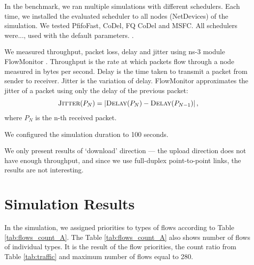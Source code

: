In the benchmark, we ran multiple simulations with different schedulers. Each time, we installed the evaluated scheduler to all nodes (NetDevices) of the simulation. We tested PfifoFast, CoDel, FQ CoDel and MSFC.  All schedulers were..., used with the default parameters. .

We measured throughput, packet loss, delay and jitter using ns-3 module FlowMonitor \cite{flowMonitor}. Throughput is the rate at which packets flow through a node measured in bytes per second. Delay is the time taken to transmit a packet from sender to receiver. Jitter is the variation of delay. FlowMonitor approximates the jitter of a packet using only the delay of the previous packet:
\[
	\textsc{Jitter}(P_N) = \left|{\textsc{Delay}(P_N) - \textsc{Delay}(P_{N-1})}\right|,
\]
where $P_N$ is the n-th received packet.

 We configured the simulation duration to 100 seconds.

We only present results of `download' direction --- the upload direction does not have enough throughput, and since we use full-duplex point-to-point links, the results are not interesting.



\section{Simulation Results}






In the simulation, we assigned priorities to types of flows according to Table \ref{tab:flows_count_A}. The Table \ref{tab:flows_count_A} also shows number of flows of individual types. It is the result of the flow priorities, the count ratio from Table \ref{tab:traffic} and maximum number of flows equal to 280.  

